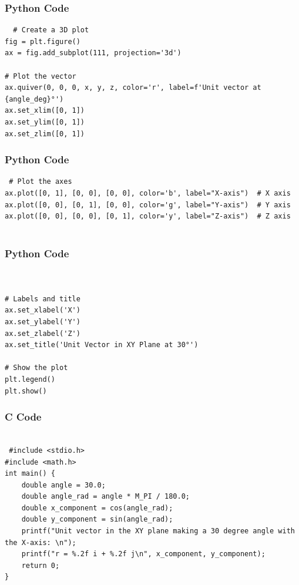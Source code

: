 \documentclass{beamer}
\begin{document}
\begin{frame}[fragile]
    \frametitle{Python Code}

    \begin{lstlisting}
  # Create a 3D plot
fig = plt.figure()
ax = fig.add_subplot(111, projection='3d')

# Plot the vector
ax.quiver(0, 0, 0, x, y, z, color='r', label=f'Unit vector at {angle_deg}°')
ax.set_xlim([0, 1])
ax.set_ylim([0, 1])
ax.set_zlim([0, 1])

    \end{lstlisting}
\end{frame}

\begin{frame}[fragile]
    \frametitle{Python Code}

    \begin{lstlisting}
 # Plot the axes
ax.plot([0, 1], [0, 0], [0, 0], color='b', label="X-axis")  # X axis
ax.plot([0, 0], [0, 1], [0, 0], color='g', label="Y-axis")  # Y axis
ax.plot([0, 0], [0, 0], [0, 1], color='y', label="Z-axis")  # Z axis


    \end{lstlisting}
\end{frame}

\begin{frame}[fragile]
    \frametitle{Python Code}

    \begin{lstlisting}
 

# Labels and title
ax.set_xlabel('X')
ax.set_ylabel('Y')
ax.set_zlabel('Z')
ax.set_title('Unit Vector in XY Plane at 30°')

# Show the plot
plt.legend()
plt.show()

\end{lstlisting}
\end{frame}
\begin{frame}[fragile]
\frametitle{C Code}
\begin{lstlisting}
  
 #include <stdio.h>
#include <math.h>
int main() {
    double angle = 30.0;
    double angle_rad = angle * M_PI / 180.0;
    double x_component = cos(angle_rad);
    double y_component = sin(angle_rad);
    printf("Unit vector in the XY plane making a 30 degree angle with the X-axis: \n");
    printf("r = %.2f i + %.2f j\n", x_component, y_component);
    return 0;
}

\end{lstlisting}
\end{frame}
\end{document}
